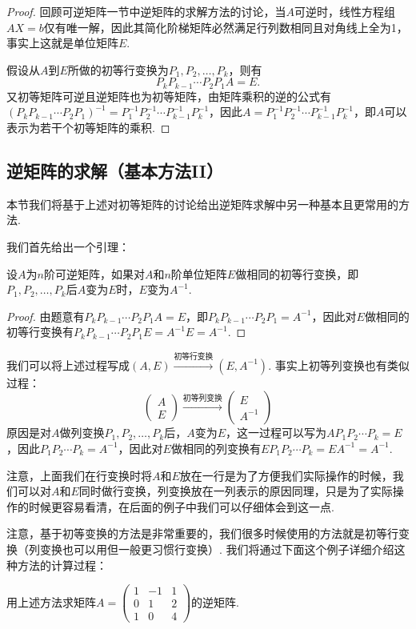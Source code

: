 \begin{proof}
    回顾可逆矩阵一节中逆矩阵的求解方法的讨论，当$A$可逆时，线性方程组$AX=b$仅有唯一解，因此其简化阶梯矩阵必然满足行列数相同且对角线上全为1，事实上这就是单位矩阵$E$.

    假设从$A$到$E$所做的初等行变换为$P_1,P_2,\ldots,P_k$，则有
    \[P_kP_{k-1}\cdots P_2P_1A=E.\]
    又初等矩阵可逆且逆矩阵也为初等矩阵，由矩阵乘积的逆的公式有$(P_kP_{k-1}\cdots P_2P_1)^{-1}=P_1^{-1}P_2^{-1}\cdots P_{k-1}^{-1}P_k^{-1}$，因此$A=P_1^{-1}P_2^{-1}\cdots P_{k-1}^{-1}P_k^{-1}$，即$A$可以表示为若干个初等矩阵的乘积.
\end{proof}

\subsection{逆矩阵的求解（基本方法II）}

本节我们将基于上述对初等矩阵的讨论给出逆矩阵求解中另一种基本且更常用的方法.

我们首先给出一个引理：
\begin{lemma}
    设$A$为$n$阶可逆矩阵，如果对$A$和$n$阶单位矩阵$E$做相同的初等行变换，即$P_1,P_2,\ldots,P_k$后$A$变为$E$时，$E$变为$A^{-1}$.
\end{lemma}

\begin{proof}
    由题意有$P_kP_{k-1}\cdots P_2P_1A=E$，即$P_kP_{k-1}\cdots P_2P_1=A^{-1}$，因此对$E$做相同的初等行变换有$P_kP_{k-1}\cdots P_2P_1E=A^{-1}E=A^{-1}$.
\end{proof}

我们可以将上述过程写成$(A,E)\xrightarrow{\text{初等行变换}}(E,A^{-1})$. 事实上初等列变换也有类似过程：
\[\begin{pmatrix}
        A \\ E
    \end{pmatrix}\xrightarrow{\text{初等列变换}}\begin{pmatrix}
        E \\ A^{-1}
    \end{pmatrix}\]
原因是对$A$做列变换$P_1,P_2,\ldots,P_k$后，$A$变为$E$，这一过程可以写为$AP_1P_2\cdots P_k=E$，因此$P_1P_2\cdots P_k=A^{-1}$，因此对$E$做相同的列变换有$EP_1P_2\cdots P_k=EA^{-1}=A^{-1}$.

注意，上面我们在行变换时将$A$和$E$放在一行是为了方便我们实际操作的时候，我们可以对$A$和$E$同时做行变换，列变换放在一列表示的原因同理，只是为了实际操作的时候更容易看清，在后面的例子中我们可以仔细体会到这一点.

注意，基于初等变换的方法是非常重要的，我们很多时候使用的方法就是初等行变换（列变换也可以用但一般更习惯行变换）. 我们将通过下面这个例子详细介绍这种方法的计算过程：
\begin{example}
    用上述方法求矩阵$A=\begin{pmatrix}1 & -1 & 1 \\ 0 & 1 & 2 \\ 1 & 0 & 4\end{pmatrix}$的逆矩阵.
\end{example}

